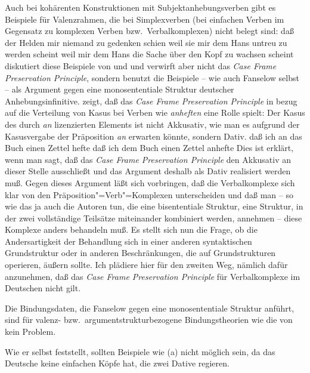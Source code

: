 {        Auch bei kohärenten Konstruktionen mit Subjektanhebungsverben gibt es Beispiele für Valenzrahmen,
        die bei Simplexverben (\dash bei einfachen Verben im Gegensatz zu komplexen Verben
        bzw.\ Verbalkomplexen) nicht belegt sind:
        \eal
        \ex daß der Helden mir niemand zu gedenken schien
        \ex weil sie mir dem Hans untreu zu werden scheint
        \ex weil mir dem Hans die Sache über den Kopf zu wachsen scheint
        \zl
        \citet[]{Grewendorf94a} diskutiert diese Beispiele von \citet[]{Olsen81a}
        und \citet{Fanselow89b} und verwirft aber nicht das \emph{Case Frame Preservation Principle},
        sondern benutzt die Beispiele -- wie auch Fanselow selbst -- als Argument gegen eine monosententiale Struktur
        deutscher Anhebungsinfinitive. \citet[]{Fanselow89b} zeigt, daß
        das \emph{Case Frame Preservation Principle} in bezug auf die Verteilung von Kasus
        bei Verben wie \emph{anheften} eine Rolle spielt: Der Kasus
        des durch \emph{an} lizenzierten Elements ist nicht Akkusativ, wie man es aufgrund
        der Kasusvergabe der Präposition \emph{an} erwarten könnte, sondern Dativ.
        \eal
        \ex daß ich an das Buch einen Zettel hefte
        \ex daß ich dem Buch einen Zettel anhefte
        \zl
        Dies ist erklärt, wenn man sagt, daß das \emph{Case Frame Preservation Principle}
        den Akkusativ an dieser Stelle ausschließt und das Argument deshalb als Dativ
        realisiert werden muß. Gegen dieses Argument läßt sich vorbringen, daß die Verbalkomplexe
        sich klar von den Präposition"=Verb"=Komplexen unterscheiden und daß man -- so wie
        das ja auch die Autoren tun, die eine bisententiale Struktur, \dash eine Struktur, in der zwei
        vollständige Teilsätze miteinander kombiniert werden, annehmen -- diese
        Komplexe anders behandeln muß. Es stellt sich nun die Frage, ob die Andersartigkeit 
        der Behandlung sich in einer anderen syntaktischen Grundstruktur oder in anderen
        Beschränkungen, die auf Grundstrukturen operieren, äußern sollte. Ich plädiere
        hier für den zweiten Weg, nämlich dafür anzunehmen, daß das \emph{Case Frame Preservation Principle}
        für Verbalkomplexe im Deutschen nicht gilt.

        Die Bindungsdaten, die Fanselow gegen eine monosententiale Struktur anführt,
        sind für valenz- bzw.\ argumentstrukturbezogene Bindungstheorien wie die von 
        kein Problem.
}
Wie er selbst feststellt, sollten Beispiele wie (a) nicht möglich sein,
da das Deutsche keine einfachen Köpfe hat, die zwei Dative regieren.

